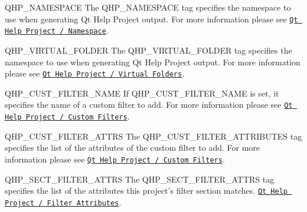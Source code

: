 \begin{DoxyDescription}
\item[{\ttfamily QHP\_\-NAMESPACE} ] The QHP\_\-NAMESPACE tag specifies the namespace to use when generating Qt Help Project output. For more information please see \href{http://doc.trolltech.com/qthelpproject.html#namespace}{\tt Qt Help Project / Namespace}.

\label{config_cfg_qhp_virtual_folder}
\hypertarget{config_cfg_qhp_virtual_folder}{}
 
\item[{\ttfamily QHP\_\-VIRTUAL\_\-FOLDER} ] The QHP\_\-VIRTUAL\_\-FOLDER tag specifies the namespace to use when generating Qt Help Project output. For more information please see \href{http://doc.trolltech.com/qthelpproject.html#virtual-folders}{\tt Qt Help Project / Virtual Folders}.

\label{config_cfg_qhp_cust_filter_name}
\hypertarget{config_cfg_qhp_cust_filter_name}{}
 
\item[{\ttfamily QHP\_\-CUST\_\-FILTER\_\-NAME} ] If QHP\_\-CUST\_\-FILTER\_\-NAME is set, it specifies the name of a custom filter to add. For more information please see \href{http://doc.trolltech.com/qthelpproject.html#custom-filters}{\tt Qt Help Project / Custom Filters}.

\label{config_cfg_qhp_cust_filter_attrs}
\hypertarget{config_cfg_qhp_cust_filter_attrs}{}
 
\item[{\ttfamily QHP\_\-CUST\_\-FILTER\_\-ATTRS} ] The QHP\_\-CUST\_\-FILTER\_\-ATTRIBUTES tag specifies the list of the attributes of the custom filter to add. For more information please see \href{http://doc.trolltech.com/qthelpproject.html#custom-filters}{\tt Qt Help Project / Custom Filters}.

\label{config_cfg_qhp_sect_filter_attrs}
\hypertarget{config_cfg_qhp_sect_filter_attrs}{}
 
\item[{\ttfamily QHP\_\-SECT\_\-FILTER\_\-ATTRS} ] The QHP\_\-SECT\_\-FILTER\_\-ATTRS tag specifies the list of the attributes this project's filter section matches. \href{http://doc.trolltech.com/qthelpproject.html#filter-attributes}{\tt Qt Help Project / Filter Attributes}.


\end{DoxyDescription}
